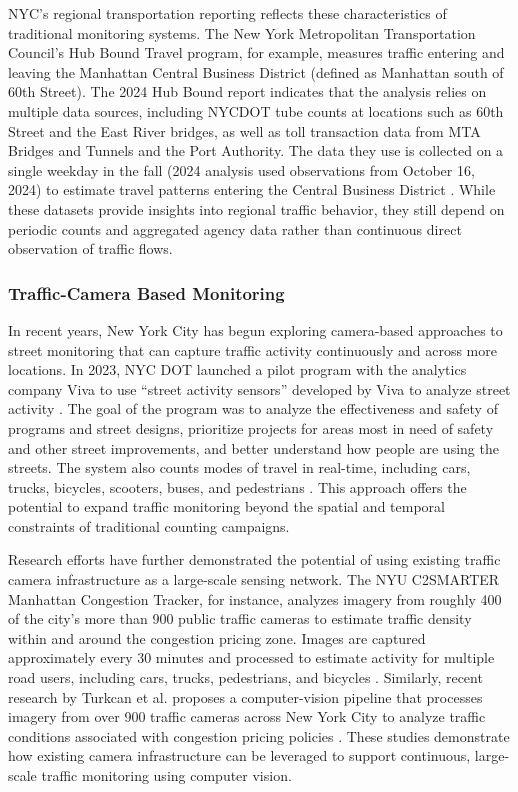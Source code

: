 NYC's regional transportation reporting reflects these characteristics of traditional
monitoring systems. The New York Metropolitan Transportation Council's Hub Bound 
Travel program, for example, measures traffic entering and leaving the Manhattan 
Central Business District (defined as Manhattan south of 60th Street). The 2024 
Hub Bound report indicates that the analysis relies on multiple data sources, 
including NYCDOT tube counts at locations such as 60th Street and the East River
bridges, as well as toll transaction data from MTA Bridges and Tunnels and the 
Port Authority. The data they use is collected on a single weekday in the fall 
(2024 analysis used observations from October 16, 2024) to estimate travel 
patterns entering the Central Business District \cite{NYCMTC_hub_2026}. 
While these datasets provide insights into 
regional traffic behavior, they still depend on periodic counts and aggregated 
agency data rather than continuous direct observation of traffic flows.


\subsubsection{Traffic-Camera Based Monitoring}

In recent years, New York City has begun exploring camera-based approaches to 
street monitoring that can capture traffic activity continuously and across more 
locations. In 2023, NYC DOT launched a pilot program with the analytics company 
Viva to use ``street activity sensors'' developed by Viva to analyze street activity
\cite{NYCDOT_viva_colab, viva_street_monitor}. 
The goal of the program was to analyze the effectiveness and safety of 
programs and street designs, prioritize projects for areas most in need of safety
and other street improvements, and better understand how people are using the 
streets. The system also counts modes of travel in real-time, including cars, 
trucks, bicycles, scooters, buses, and pedestrians \cite{NYCDOT_viva_colab}. 
This approach offers the potential to expand traffic monitoring beyond the 
spatial and temporal constraints of traditional counting campaigns.

Research efforts have further demonstrated the potential of using existing traffic 
camera infrastructure as a large-scale sensing network. The NYU C2SMARTER Manhattan
Congestion Tracker, for instance, analyzes imagery from roughly 400 of the city's 
more than 900 public traffic cameras to estimate traffic density within and around
the congestion pricing zone. Images are captured approximately every 30 minutes and
processed to estimate activity for multiple road users, including cars, trucks, 
pedestrians, and bicycles \cite{NYU_tracker_2025}. 
Similarly, recent research by Turkcan et al. proposes a computer-vision pipeline 
that processes imagery from over 900 traffic cameras across New York City to analyze 
traffic conditions associated with congestion pricing policies \cite{turkcan2026visionbasedanalysiscongestionpricing}. 
These studies demonstrate how existing camera infrastructure can be leveraged to 
support continuous, large-scale traffic monitoring using computer vision.


